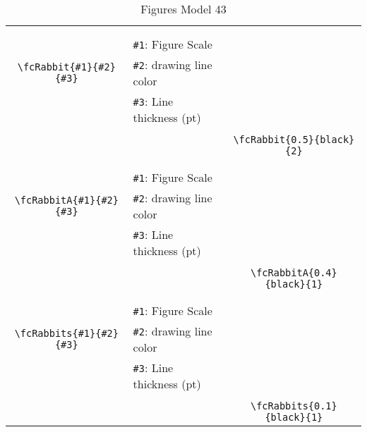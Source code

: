 \documentclass[x11names]{article}
\begin{document}
\begin{table}[H]
\begin{tabular}{|c|l|c|}
	&&\multirow{5}{*}{\fcRabbit{0.5}{black}{2}}\\	&&\\	&\verb|#1|: Figure Scale &\\	\verb|\fcRabbit{#1}{#2}{#3}|&	\verb|#2|: drawing line color &\\	&\verb|#3|: Line thickness (pt) &\\ &&\\&&	\verb|\fcRabbit{0.5}{black}{2}|\\\hline 	
	&&\multirow{5}{*}{\fcRabbitA{0.4}{black}{1}}\\	&&\\	&\verb|#1|: Figure Scale &\\	\verb|\fcRabbitA{#1}{#2}{#3}|&	\verb|#2|: drawing line color &\\	&\verb|#3|: Line thickness (pt) &\\ &&\\&&	\verb|\fcRabbitA{0.4}{black}{1}|\\\hline 	
	&&\multirow{5}{*}{\fcRabbits{0.1}{black}{1}}\\	&&\\	&\verb|#1|: Figure Scale &\\	\verb|\fcRabbits{#1}{#2}{#3}|&	\verb|#2|: drawing line color &\\	&\verb|#3|: Line thickness (pt) &\\ &&\\&&	\verb|\fcRabbits{0.1}{black}{1}|\\\hline 	\hline\end{tabular}\caption{Figures Model 43}\label{tab43}\end{table}
\end{document}
